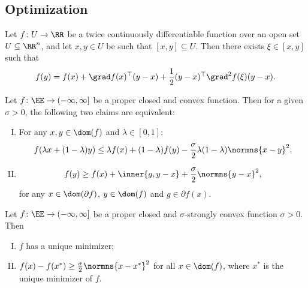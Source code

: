 \subsection{Optimization}
\begin{lemma}\label{lem:linear-approximation-theorem}
    Let $f\colon U\to\RR$ be a twice continuously differentiable function over an open set $U\subseteq \RR^n$, and let $x,y\in U$ be such that $[x,y]\subseteq U$. Then there exists $\xi\in[x,y]$ such that
    \begin{equation*}
        f(y) = f(x) + \grad f(x)^{\top}(y-x) + \frac{1}{2}(y-x)^{\top}\grad^2 f(\xi)(y-x).
    \end{equation*}
\end{lemma}
\begin{lemma}\label{lem:first-order-character-ization-of-strong-convexity}
    Let $f\colon \EE\to(-\infty,\infty]$ be a proper closed and convex function. Then for a given $\sigma>0$, the following two claims are equivalent:
    \begin{enumerate}[(I)]
        \item For any $x,y\in\dom(f)$ and $\lambda\in[0,1]$:
        \begin{equation*}
            f(\lambda x+(1-\lambda )y) \leq \lambda f(x) + (1-\lambda)f(y) - \frac{\sigma}{2}\lambda(1-\lambda)\normns{x-y}^2.
        \end{equation*}
        \item 
        \begin{equation*}
            f(y)\geq f(x) + \inner{g, y-x} + \frac{\sigma}{2}\normns{y-x}^2,     
        \end{equation*}
        for any $x\in\dom(\partial f)$, $y\in\dom(f)$ and $g\in\partial f(x)$.
    \end{enumerate}
\end{lemma}

\begin{lemma}\label{lem:strongly-convex-uniqueness-of-minimizer}
    Let $f\colon \EE\to (-\infty,\infty]$ be a proper closed and $\sigma$-strongly convex function $\sigma>0$. Then
    \begin{enumerate}[(I)]
        \item $f$ has a unique minimizer;
        \item $f(x)-f(x^*)\geq \frac{\sigma}{2}\normns{x-x^*}^2$ for all $x\in\dom(f)$, where $x^*$ is the unique minimizer of $f$.
    \end{enumerate}
\end{lemma}

